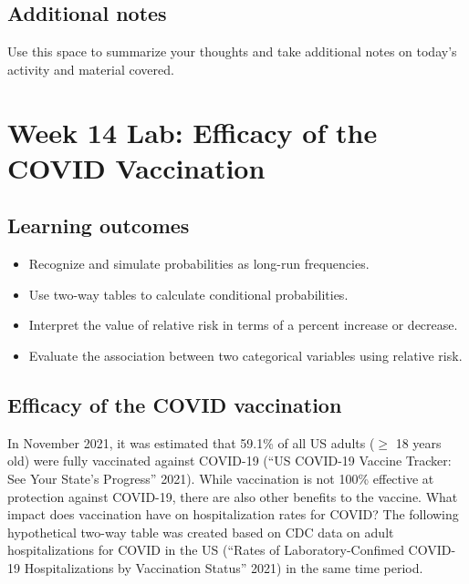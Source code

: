 \documentclass[
]{report}
\begin{document}
\hypertarget{additional-notes-9}{%
\subsection{Additional notes}\label{additional-notes-9}}

Use this space to summarize your thoughts and take additional notes on today's activity and material covered.

\newpage

\hypertarget{week-14-lab-efficacy-of-the-covid-vaccination}{%
\section{Week 14 Lab: Efficacy of the COVID Vaccination}\label{week-14-lab-efficacy-of-the-covid-vaccination}}


\hypertarget{learning-outcomes-13}{%
\subsection{Learning outcomes}\label{learning-outcomes-13}}

\begin{itemize}
\item
  Recognize and simulate probabilities as long-run frequencies.
\item
  Use two-way tables to calculate conditional probabilities.
\item
  Interpret the value of relative risk in terms of a percent increase or decrease.
\item
  Evaluate the association between two categorical variables using relative risk.
\end{itemize}

\hypertarget{efficacy-of-the-covid-vaccination}{%
\subsection{Efficacy of the COVID vaccination}\label{efficacy-of-the-covid-vaccination}}

In November 2021, it was estimated that 59.1\% of all US adults (\(\ge\) 18 years old) were fully vaccinated against COVID-19 ({``US COVID-19 Vaccine Tracker: See Your State's Progress''} 2021). While vaccination is not 100\% effective at protection against COVID-19, there are also other benefits to the vaccine. What impact does vaccination have on hospitalization rates for COVID? The following hypothetical two-way table was created based on CDC data on adult hospitalizations for COVID in the US ({``Rates of Laboratory-Confimed COVID-19 Hospitalizations by Vaccination Status''} 2021) in the same time period.
\end{document}
